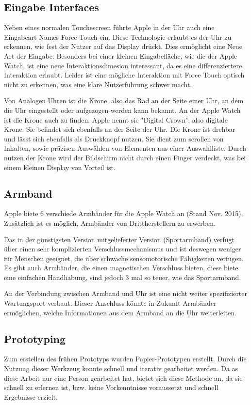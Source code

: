\subsection{Eingabe Interfaces}
\label{ch:eingabe_interface}
Neben eines normalen Touchescreen führte Apple in der Uhr auch eine Eingabeart Names Force Touch ein. Diese Technologie erlaubt es der Uhr zu erkennen, wie fest der Nutzer auf das Display drückt. Dies ermöglicht eine Neue Art der Eingabe. Besonders bei einer kleinen Eingabefläche, wie die der Apple Watch, ist eine neue Interaktionsdimesion interessant, da es eine differenziertere Interaktion erlaubt. Leider ist eine mögliche Interaktion mit Force Touch optisch nicht zu erkennen, was eine klare Nutzerführung schwer macht.

 Von Analogen Uhren ist die Krone, also das Rad an der Seite einer Uhr, an dem die Uhr eingestellt oder aufgezogen werden kann bekannt. An der Apple Watch ist die Krone auch zu finden. Apple nennt sie "Digital Crown", also digitale Krone. Sie befindet sich ebenfalls an der Seite der Uhr. Die Krone ist drehbar und lässt sich ebenfalls als Druckknopf nutzen. Sie dient zum scrollen von Inhalten, sowie präzisen Auswählen von Elementen aus einer Auswahlliste. Durch nutzen der Krone wird der Bildschirm nicht durch einen Finger verdeckt, was bei einem kleinen Display von Vorteil ist.
\subsection{Armband}
Apple biete 6 verschiede Armbänder für die Apple Watch an (Stand Nov. 2015). Zusätzlich ist es möglich, Armbänder von Drittherstellern zu erwerben. 

Das in der günstigsten Version mitgelieferter Version (Sportarmband) verfügt über einen sehr komplizierten Verschlussmechanismus und ist deswegen weniger für Menschen geeignet, die über schwache sensomotorische Fähigkeiten verfügen. Es gibt auch Armbänder, die einen magnetischen Verschluss bieten, diese biete eine einfachen Handhabung, sind jedoch 3 mal so teuer, wie das Sportarmband.

An der Verbindung zwischen Armband und Uhr ist eine nicht weiter spezifizierter Wartungsport verbaut. Dieser Anschluss könnte in Zukunft Armbänder ermöglichen, welche Informationen aus dem Armband an die Uhr weiterleiten.
\subsection{Prototyping}
Zum erstellen des frühen Prototyps wurden Papier-Prototypen erstellt. Durch die Nutzung dieser Werkzeug konnte schnell und iterativ gearbeitet werden. Da as diese Arbeit nur eine Person gearbeitet hat, bietet sich diese Methode an, da sie schnell zu erlernen ist, bzw. keine Vorkenntnisse voraussetzt und schnell Ergebnisse erzielt.


